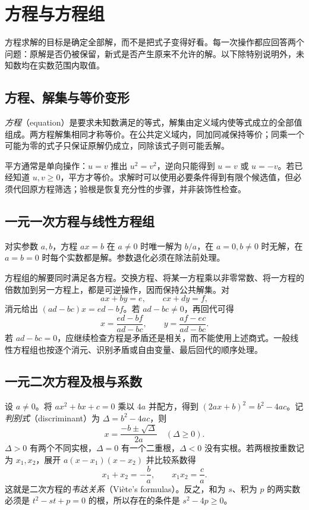 \setcounter{chapter}{4} %
\chapter{方程与方程组}
\label{chap:em-equations}
方程求解的目标是确定全部解，而不是把式子变得好看。每一次操作都应回答两个问题：原解是否仍被保留，新式是否产生原来不允许的解。以下除特别说明外，未知数均在实数范围内取值。

\section{方程、解集与等价变形}
\emph{方程}（equation）是要求未知数满足的等式，解集由定义域内使等式成立的全部值组成。两方程解集相同才称等价。在公共定义域内，同加同减保持等价；同乘一个可能为零的式子只保证原解仍成立，同除该式子则可能丢解。

平方通常是单向操作：$u=v$ 推出 $u^2=v^2$，逆向只能得到 $u=v$ 或 $u=-v$。若已经知道 $u,v\ge0$，平方才等价。求解时可以使用必要条件得到有限个候选值，但必须代回原方程筛选；验根是恢复充分性的步骤，并非装饰性检查。

\section{一元一次方程与线性方程组}
对实参数 $a,b$，方程 $ax=b$ 在 $a\ne0$ 时唯一解为 $b/a$，在 $a=0,b\ne0$ 时无解，在 $a=b=0$ 时每个实数都是解。参数退化必须在除法前处理。

方程组的解要同时满足各方程。交换方程、将某一方程乘以非零常数、将一方程的倍数加到另一方程上，都是可逆操作，因而保持公共解集。对
\[
 ax+by=e,\qquad cx+dy=f,
\]
消元给出 $(ad-bc)x=ed-bf$。若 $ad-bc\ne0$，再回代可得
\[
 x=\frac{ed-bf}{ad-bc},\qquad y=\frac{af-ec}{ad-bc}.
\]
若 $ad-bc=0$，应继续检查方程是矛盾还是相关，而不能使用上述商式。一般线性方程组也按逐个消元、识别矛盾或自由变量、最后回代的顺序处理。

\section{一元二次方程及根与系数}
设 $a\ne0$。将 $ax^2+bx+c=0$ 乘以 $4a$ 并配方，得到 $(2ax+b)^2=b^2-4ac$。记\emph{判别式}（discriminant）为 $\Delta=b^2-4ac$，则
\begin{equation}\label{eq:em-quadratic}
 x=\frac{-b\pm\sqrt\Delta}{2a}\quad(\Delta\ge0).
\end{equation}
$\Delta>0$ 有两个不同实根，$\Delta=0$ 有一个二重根，$\Delta<0$ 没有实根。若两根按重数记为 $x_1,x_2$，展开 $a(x-x_1)(x-x_2)$ 并比较系数得
\[
 x_1+x_2=-\frac ba,\qquad x_1x_2=\frac ca.
\]
这就是二次方程的\emph{韦达关系}（Viète's formulas）。反之，和为 $s$、积为 $p$ 的两实数必须是 $t^2-st+p=0$ 的根，所以存在的条件是 $s^2-4p\ge0$。

